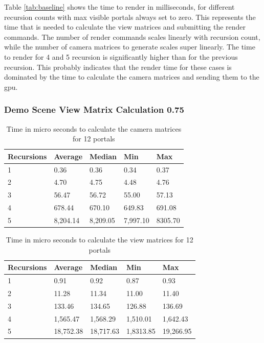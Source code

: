 Table \ref{tab:baseline} shows the time to render in milliseconds, for different recursion counts with max visible portals always set to zero. This represents the time that is needed to calculate the view matrices and submitting the render commands. The number of render commands scales linearly with recursion count, while the number of camera matrices to generate scales super linearly. The time to render for 4 and 5 recursion is significantly higher than for the previous recursion. This probably indicates that the render time for these cases is dominated by the time to calculate the camera matrices and sending them to the \gls{gpu}.

\subsubsection{Demo Scene View Matrix Calculation 0.75}
\label{section:perfmatrixcalc}

\begin{table}[H]
	\label{tab:cameramatricecalc}
	\begin{tabular}{|l|l|l|l|l|}
		\hline
		Recursions & Average & Median  & Min     & Max     \\ \hline
		1          & 0.36    & 0.36    & 0.34    & 0.37    \\ \hline
		2          & 4.70    & 4.75    & 4.48    & 4.76    \\ \hline
		3          & 56.47   & 56.72   & 55.00   & 57.13   \\ \hline
		4          & 678.44  & 670.10  & 649.83  & 691.08  \\ \hline
		5          & 8,204.14 & 8,209.05 & 7,997.10 & 8305.70\\ \hline
	\end{tabular}
	\caption{Time in micro seconds to calculate the camera matrices for 12 portals}
\end{table}

\begin{table}[H]
	\label{tab:cameramatricecalcinverse}
	\begin{tabular}{|l|l|l|l|l|}
		\hline
		Recursions & Average   & Median  	& Min     	& Max        \\ \hline
		1          & 0.91      & 0.92		& 0.87    	& 0.93       \\ \hline
		2          & 11.28     & 11.34		& 11.00    	& 11.40      \\ \hline
		3          & 133.46    & 134.65		& 126.88   	& 136.69     \\ \hline
		4          & 1,565.47  & 1,568.29	& 1,510.01  & 1,642.43   \\ \hline
		5          & 18,752.38 & 18,717.63	& 1,8313.85 & 19,266.95 \\ \hline
	\end{tabular}
	\caption{Time in micro seconds to calculate the view matrices for 12 portals}
\end{table}

